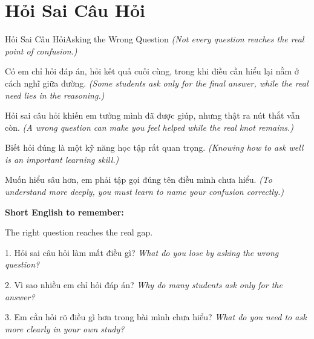 \section{Hỏi Sai Câu Hỏi}
\begin{truyen}{Hỏi Sai Câu Hỏi}{Asking the Wrong Question}
\textit{(Not every question reaches the real point of confusion.)}

Có em chỉ hỏi đáp án, hỏi kết quả cuối cùng, trong khi điều cần hiểu lại nằm ở cách nghĩ giữa đường.
\textit{(Some students ask only for the final answer, while the real need lies in the reasoning.)}

Hỏi sai câu hỏi khiến em tưởng mình đã được giúp, nhưng thật ra nút thắt vẫn còn.
\textit{(A wrong question can make you feel helped while the real knot remains.)}

Biết hỏi đúng là một kỹ năng học tập rất quan trọng.
\textit{(Knowing how to ask well is an important learning skill.)}
\end{truyen}

\begin{baihoc}
Muốn hiểu sâu hơn, em phải tập gọi đúng tên điều mình chưa hiểu.
\textit{(To understand more deeply, you must learn to name your confusion correctly.)}
\end{baihoc}

\begin{ghinhoanh}
\textbf{Short English to remember:}

The right question reaches the real gap.

\end{ghinhoanh}

\begin{tuhocnhanh}
1. Hỏi sai câu hỏi làm mất điều gì? \textit{What do you lose by asking the wrong question?}

2. Vì sao nhiều em chỉ hỏi đáp án? \textit{Why do many students ask only for the answer?}

3. Em cần hỏi rõ điều gì hơn trong bài mình chưa hiểu? \textit{What do you need to ask more clearly in your own study?}
\end{tuhocnhanh}
\ngancach


